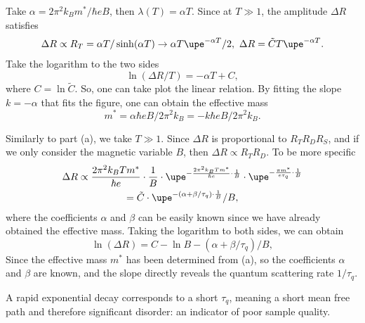 \begin{solution}\leavevmode
  \begin{enumext}
    \item Take $\alpha = 2\pi^2k_Bm^*/\hbar eB$,
    then $\lambda(T) = \alpha T$.
    Since at $T \gg 1$, the
    amplitude $\Delta R$ satisfies
    \[
      \Delta R \propto R_T = \alpha T/\sinh(\alpha T)
      \to \alpha T \upe^{-\alpha T}/2, \
      \Delta R = \tilde C T\upe^{-\alpha T}.
    \]
    Take the logarithm to the two sides
    \[
      \ln(\Delta R/T) = -\alpha T + C,
    \]
    where $C = \ln\tilde C$.
    So, one can take plot the linear relation.
    By fitting the slope $k = -\alpha$ that fits the figure, one can obtain
    the effective mass
    \[
      m^* = \alpha \hbar eB/2\pi^2k_B
    = -k \hbar eB/2\pi^2k_B.
    \]
    \item Similarly to part (a), we take $T \gg 1$.
    Since $\Delta R$ is proportional to $R_TR_DR_S$, and if we only
    consider the magnetic variable $B$, then $\Delta R \propto R_TR_D$.
    To be more specific
    \begin{multline*}
      \Delta R \propto \frac{2\pi^2 k_BTm^*}{\hbar e} \cdot \frac1B \cdot
               \upe^{-\frac{2\pi^2 k_BTm^*}{\hbar e} \cdot \frac1B} \cdot
               \upe^{-\frac{\pi m^*}{e\tau_q} \cdot \frac1B}\\
    = \tilde C \cdot \upe^{-(\alpha+\beta/\tau_q)\cdot\frac1B}/B,
    \end{multline*}
    where the coefficients $\alpha$ and $\beta$ can be easily known since we
    have already obtained the effective mass. Taking the logarithm to both
    sides, we can obtain
    \[
      \ln(\Delta R)  = C - \ln B - (\alpha + \beta/\tau_q)/B,
    \]
    Since the effective mass $m^*$ has been determined from (a), so the
    coefficients $\alpha$ and $\beta$ are known, and the slope directly reveals
    the quantum scattering rate $1/\tau_q$.

    A rapid exponential decay corresponds to a short $\tau_q$, meaning a short
    mean free path and therefore significant disorder: an indicator of poor
    sample quality.
  \end{enumext}
\end{solution}